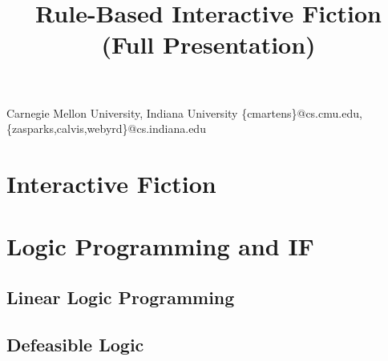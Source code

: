 \documentclass[computermodern]{sigplanconf}
\begin{document}
%

\title{Rule-Based Interactive Fiction (Full Presentation)}


           {Carnegie Mellon University, Indiana University}
           {\{cmartens\}@cs.cmu.edu,\{zasparks,calvis,webyrd\}@cs.indiana.edu}

\maketitle

\section{Interactive Fiction}



\section{Logic Programming and IF}



\subsection{Linear Logic Programming}



\subsection{Defeasible Logic}



\acks



\nocite{Covington:1996:PPD:230996}
\nocite{apt03principles}
\nocite{Marriottp98Pwc}
\nocite{trs2005}
\nocite{zarfrulespage}




\end{document}
